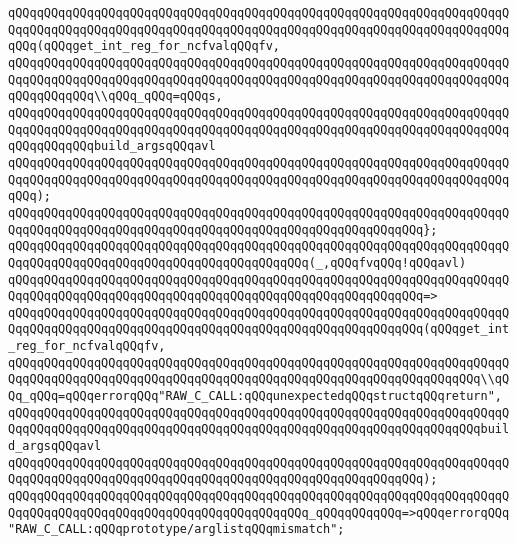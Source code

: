 \newline
\verb|qQQqqQQqqQQqqQQqqQQqqQQqqQQqqQQqqQQqqQQqqQQqqQQqqQQqqQQqqQQqqQQqqQQqqQQqqQQqqQQqqQQqqQQqqQQqqQQqqQQqqQQqqQQqqQQqqQQqqQQqqQQqqQQqqQQqqQQqqQQqqQQq(qQQqget_int_reg_for_ncfvalqQQqfv,|\newline
\verb|qQQqqQQqqQQqqQQqqQQqqQQqqQQqqQQqqQQqqQQqqQQqqQQqqQQqqQQqqQQqqQQqqQQqqQQqqQQqqQQqqQQqqQQqqQQqqQQqqQQqqQQqqQQqqQQqqQQqqQQqqQQqqQQqqQQqqQQqqQQqqQQqqQQqqQQq\\qQQq_qQQq=qQQqs,|\newline
\verb|qQQqqQQqqQQqqQQqqQQqqQQqqQQqqQQqqQQqqQQqqQQqqQQqqQQqqQQqqQQqqQQqqQQqqQQqqQQqqQQqqQQqqQQqqQQqqQQqqQQqqQQqqQQqqQQqqQQqqQQqqQQqqQQqqQQqqQQqqQQqqQQqqQQqqQQqbuild_argsqQQqavl|\newline
\verb|qQQqqQQqqQQqqQQqqQQqqQQqqQQqqQQqqQQqqQQqqQQqqQQqqQQqqQQqqQQqqQQqqQQqqQQqqQQqqQQqqQQqqQQqqQQqqQQqqQQqqQQqqQQqqQQqqQQqqQQqqQQqqQQqqQQqqQQqqQQqqQQq);|\newline
\verb|qQQqqQQqqQQqqQQqqQQqqQQqqQQqqQQqqQQqqQQqqQQqqQQqqQQqqQQqqQQqqQQqqQQqqQQqqQQqqQQqqQQqqQQqqQQqqQQqqQQqqQQqqQQqqQQqqQQqqQQqqQQqqQQq};|\newline
\newline
\verb|qQQqqQQqqQQqqQQqqQQqqQQqqQQqqQQqqQQqqQQqqQQqqQQqqQQqqQQqqQQqqQQqqQQqqQQqqQQqqQQqqQQqqQQqqQQqqQQqqQQqqQQqqQQqqQQq(_,qQQqfvqQQq!qQQqavl)|\newline
\verb|qQQqqQQqqQQqqQQqqQQqqQQqqQQqqQQqqQQqqQQqqQQqqQQqqQQqqQQqqQQqqQQqqQQqqQQqqQQqqQQqqQQqqQQqqQQqqQQqqQQqqQQqqQQqqQQqqQQqqQQqqQQqqQQq=>|\newline
\verb|qQQqqQQqqQQqqQQqqQQqqQQqqQQqqQQqqQQqqQQqqQQqqQQqqQQqqQQqqQQqqQQqqQQqqQQqqQQqqQQqqQQqqQQqqQQqqQQqqQQqqQQqqQQqqQQqqQQqqQQqqQQqqQQq(qQQqget_int_reg_for_ncfvalqQQqfv,|\newline
\verb|qQQqqQQqqQQqqQQqqQQqqQQqqQQqqQQqqQQqqQQqqQQqqQQqqQQqqQQqqQQqqQQqqQQqqQQqqQQqqQQqqQQqqQQqqQQqqQQqqQQqqQQqqQQqqQQqqQQqqQQqqQQqqQQqqQQqqQQq\\qQQq_qQQq=qQQqerrorqQQq"RAW_C_CALL:qQQqunexpectedqQQqstructqQQqreturn",|\newline
\verb|qQQqqQQqqQQqqQQqqQQqqQQqqQQqqQQqqQQqqQQqqQQqqQQqqQQqqQQqqQQqqQQqqQQqqQQqqQQqqQQqqQQqqQQqqQQqqQQqqQQqqQQqqQQqqQQqqQQqqQQqqQQqqQQqqQQqqQQqbuild_argsqQQqavl|\newline
\verb|qQQqqQQqqQQqqQQqqQQqqQQqqQQqqQQqqQQqqQQqqQQqqQQqqQQqqQQqqQQqqQQqqQQqqQQqqQQqqQQqqQQqqQQqqQQqqQQqqQQqqQQqqQQqqQQqqQQqqQQqqQQqqQQq);|\newline
\newline
\verb|qQQqqQQqqQQqqQQqqQQqqQQqqQQqqQQqqQQqqQQqqQQqqQQqqQQqqQQqqQQqqQQqqQQqqQQqqQQqqQQqqQQqqQQqqQQqqQQqqQQqqQQqqQQqqQQq_qQQqqQQqqQQq=>qQQqerrorqQQq"RAW_C_CALL:qQQqprototype/arglistqQQqmismatch";|\newline
